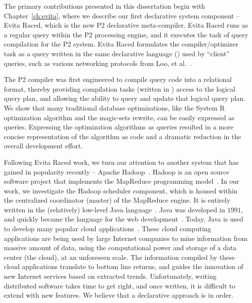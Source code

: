 The primary contributions presented in this dissertation begin with
Chapter~\ref{ch:evita}, where we describe our first declarative system
component -- Evita Raced, which is the new P2 declarative meta-compiler.  Evita
Raced runs as a regular query within the P2 processing engine, and it executes
the task of query compilation for the P2 system.  Evita Raced formulates the
compiler/optimizer task as a query written in the same declarative language
(\OVERLOG) used by ``client'' queries, such as various networking protocols
from Loo, et al.~\cite{loo-sigmod06, p2:sosp}.

The P2 compiler was first engineered to compile query code into a relational
format, thereby providing compilation tasks (written in \OVERLOG) access to the
logical query plan, and allowing the ability to query and update that logical
query plan.  We show that many traditional database optimizations, like the
System R optimization algorithm and the magic-sets rewrite, can be easily
expressed as \OVERLOG queries.  Expressing the optimization algorithms as
\OVERLOG queries resulted in a more concise representation of the algorithm as
code and a dramatic reduction in the overall development effort.
 
Following Evita Raced work, we turn our attention to another system that has
gained in popularity recently -- Apache Hadoop~\cite{hadoop}.  Hadoop is an
open source software project that implements the MapReduce programming
model~\cite{mapreduce-osdi}.  In our work, we investigate the Hadoop scheduler
component, which is housed within the centralized coordinator (master) of the
MapReduce engine.  It is entirely written in the (relatively) low-level Java
language~\cite{java}.  Java was developed in $1991$, and quickly became the
language for the web development~\cite{java-history}.  Today, Java is used to
develop many popular {\emph cloud} applications~\cite{pig-sigmod, hive-vldb,
zookeeper, hbase, cassandra}.  These {\emph cloud computing} applications are
being used by large Internet companies to mine information from massive amount
of data, using the computational power and storage of a data center (the
cloud), at an unforeseen scale.  The information compiled by these cloud
applications translate to bottom line returns, and guides the innovation of new
Internet services based on extracted trends.  Unfortunately, writing
distributed software takes time to get right, and once written, it is difficult
to extend with new features.  We believe that a declarative approach is in
order.

